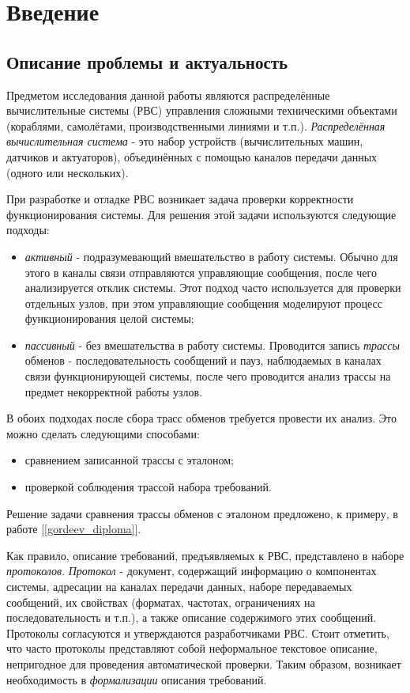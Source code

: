 \section{Введение}

\subsection{Описание проблемы и актуальность}

Предметом исследования данной работы являются распределённые вычислительные 
системы (РВС) управления сложными техническими объектами (кораблями, 
самолётами, производственными линиями и т.п.). \textit{Распределённая 
вычислительная система} - это набор устройств (вычислительных машин, датчиков и 
актуаторов), объединённых с помощью каналов передачи данных (одного или 
нескольких). 

При разработке и отладке РВС возникает задача проверки корректности 
функционирования системы. Для решения этой задачи используются следующие 
подходы:

\begin{itemize}
 \item \textit{активный} - подразумевающий вмешательство в работу системы. 
Обычно для этого в каналы связи отправляются управляющие сообщения, 
после чего анализируется отклик системы. Этот подход часто используется для 
проверки отдельных узлов, при этом управляющие сообщения моделируют 
процесс функционирования целой системы;
 \item \textit{пассивный} - без вмешательства в работу системы. Проводится 
запись \textit{трассы} обменов - последовательность сообщений и пауз, 
наблюдаемых в каналах связи функционирующей системы, после чего проводится 
анализ трассы на предмет некорректной работы узлов.
\end{itemize}

В обоих подходах после сбора трасс обменов требуется провести их анализ. Это 
можно сделать следующими способами:

\begin{itemize}
 \item сравнением записанной трассы с эталоном;
 \item проверкой соблюдения трассой набора требований.
\end{itemize}

Решение задачи сравнения трассы обменов с эталоном предложено, к примеру, в 
работе [\ref{gordeev_diploma}].

Как правило, описание требований, предъявляемых к РВС, представлено в 
наборе \textit{протоколов}. \textit{Протокол} - документ, содержащий 
информацию о компонентах системы, адресации на каналах передачи данных, наборе 
передаваемых сообщений, их свойствах (форматах, частотах, ограничениях на 
последовательность и т.п.), а также описание содержимого этих сообщений. 
Протоколы согласуются и утверждаются разработчиками РВС. Стоит отметить, 
что часто протоколы представляют собой неформальное текстовое описание, 
непригодное для проведения автоматической проверки. Таким образом, возникает 
необходимость в \textit{формализации} описания требований.

